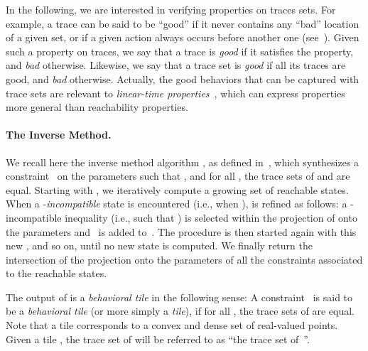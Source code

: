 \documentclass[submission,copyright,creativecommons]{eptcs}
\newcommand{\paragraphe}[1]{\paragraph{#1.}}
\begin{document}
In the following, we are interested in verifying properties on traces sets.
For example,
a trace can be said to be ``good'' if it never contains any ``bad'' location of a given set,
or if a given action always occurs before another one (see~\cite{af10}).
Given such a property on traces, we say that a trace is \emph{good} if it satisfies the property, and \emph{bad} otherwise.
Likewise, we say that a trace set is \emph{good} if all its traces are good, and \emph{bad} otherwise.
Actually, the good behaviors that can be captured with trace sets are relevant to {\em linear-time properties}~\cite{bk08}, which can express properties more general than reachability properties.





\paragraphe{The Inverse Method} \label{ss:im}






We recall here the inverse method algorithm , as defined in~\cite{acef09}, which synthesizes a constraint~ on the parameters such that , and for all , the trace sets of  and  are equal.
Starting with ,
we iteratively compute a growing set of reachable states.
When a -\emph{incompatible} state  is encountered (i.e., when \mbox{}),  is refined as follows:
a -incompatible inequality  (i.e., such that \mbox{}) is selected within the projection of  onto the parameters and~ is added to~.
The procedure is then started again with this new , and so on, until no new state is computed.
We finally return the intersection of the projection onto the parameters of all the constraints associated to the reachable states.

The output of  is a \emph{behavioral tile} in the following sense:
	A constraint~ is said to be a {\em behavioral tile} (or more simply a {\em tile}), if for all , the trace sets of  are equal.
Note that a tile corresponds to a convex and dense set of real-valued points.
Given a tile , the trace set of  will be referred to as ``the trace set of~''.



\IncMargin{1em}
\begin{algorithm}[ht!]

 


\BlankLine





\caption{}\label{algo:IM}
\end{algorithm}\DecMargin{1em}
\end{document}
